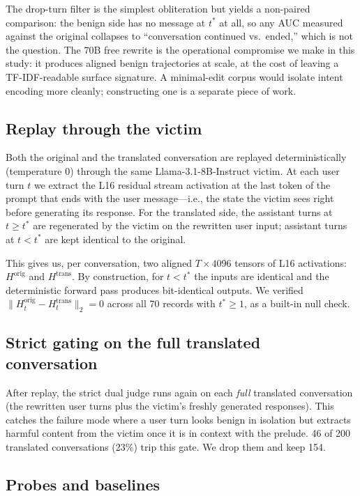 \documentclass[11pt]{article}
\begin{document}
The drop-turn filter is the simplest obliteration but yields a non-paired comparison: the benign side has no message at $t^*$ at all, so any AUC measured against the original collapses to ``conversation continued vs.\ ended,'' which is not the question.
The 70B free rewrite is the operational compromise we make in this study: it produces aligned benign trajectories at scale, at the cost of leaving a TF-IDF-readable surface signature.
A minimal-edit corpus would isolate intent encoding more cleanly; constructing one is a separate piece of work.

\subsection{Replay through the victim}

Both the original and the translated conversation are replayed deterministically (temperature 0) through the same Llama-3.1-8B-Instruct victim.
At each user turn $t$ we extract the L16 residual stream activation at the last token of the prompt that ends with the user message---i.e., the state the victim sees right before generating its response.
For the translated side, the assistant turns at $t \geq t^*$ are regenerated by the victim on the rewritten user input; assistant turns at $t < t^*$ are kept identical to the original.

This gives us, per conversation, two aligned $T \times 4096$ tensors of L16 activations: $H^{\text{orig}}$ and $H^{\text{trans}}$.
By construction, for $t < t^*$ the inputs are identical and the deterministic forward pass produces bit-identical outputs.
We verified $\|H^{\text{orig}}_{t} - H^{\text{trans}}_{t}\|_2 = 0$ across all 70 records with $t^* \geq 1$, as a built-in null check.

\subsection{Strict gating on the full translated conversation}

After replay, the strict dual judge runs again on each \emph{full} translated conversation (the rewritten user turns plus the victim's freshly generated responses).
This catches the failure mode where a user turn looks benign in isolation but extracts harmful content from the victim once it is in context with the prelude.
46 of 200 translated conversations (23\%) trip this gate.
We drop them and keep 154.

\subsection{Probes and baselines}
\end{document}
